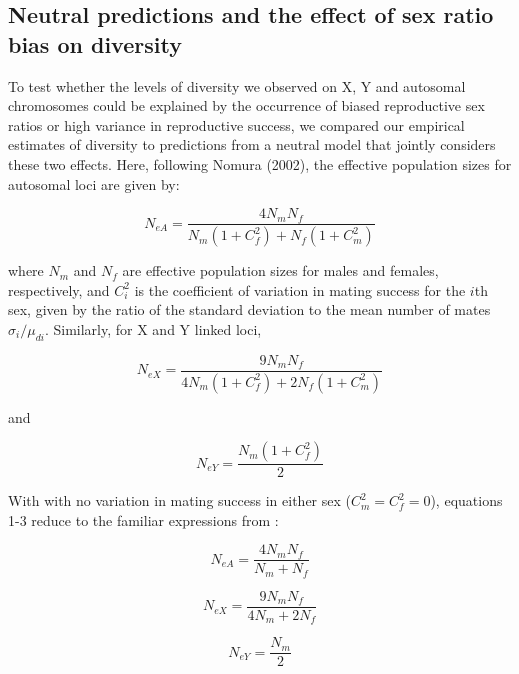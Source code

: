 \documentclass[9pt,twocolumn,twoside]{gsajnl}
\begin{document}
\subsection*{Neutral predictions and the effect of sex ratio bias on diversity}
To test whether the levels of diversity we observed on X, Y and autosomal chromosomes could be explained by the occurrence of biased reproductive sex ratios or high variance in reproductive success, we compared our empirical estimates of diversity to predictions from a neutral model that jointly considers these two effects. Here, following Nomura (2002), the effective population sizes for autosomal loci are given by:

\begin{equation}
N_{e{A}} = \frac{4N_{m}N_{f}}{N_{m}(1+C^2_{f})+N_{f}(1+C^2_{m})}\label{eq:NeA}
\end{equation}

where $N_{m}$ and $N_{f}$ are effective population sizes for males and females, respectively, and $C^2_{i}$ is the coefficient of variation in mating success for the $i$th sex, given by the ratio of the standard deviation to the mean number of mates $\sigma_{i}/\mu_{d{i}}$. Similarly, for X and Y linked loci, 

\begin{equation}
N_{e{X}} = \frac{9N_{m}N_{f}}{4N_{m}(1+C^2_{f})+2N_{f}(1+C^2_{m})}\label{eq:NeX}
\end{equation}

and

\begin{equation}
N_{e{Y}} = \frac{N_{m}(1+C^2_{f})}{2}\label{eq:NeY}
\end{equation}

With with no variation in mating success in either sex ($C^2_{m}=C^2_{f}=0$), equations 1-3 reduce to the familiar expressions from \citep{wright1931evolution}:

\begin{equation}
N_{e{A}} = \frac{4N_{m}N_{f}}{N_{m}+N_{f}}\label{eq:NeA}
\end{equation}


\begin{equation}
N_{e{X}} = \frac{9N_{m}N_{f}}{4N_{m}+2N_{f}}\label{eq:NeX}
\end{equation}

\begin{equation}
N_{e{Y}} = \frac{N_{m}}{2}\label{eq:NeY}
\end{equation}
\end{document}
